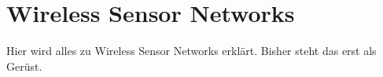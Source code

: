 \section{Wireless Sensor Networks}\label{s:WirelessSensorNetworks}

Hier wird alles zu Wireless Sensor Networks erklärt. Bisher steht das erst als Gerüst.







